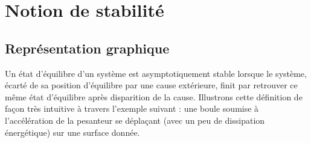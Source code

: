 \def\xxactivite{Cours}
\def\xxauteur{\textsl{Xavier Pessoles}}

\fichefalse
\proftrue
\tdfalse
\courstrue

\def\xxnumchapitre{Chapitre 3 \vspace{.2cm}}
\def\xxchapitre{\hspace{.12cm} Stabilité des systèmes}

\def\xxcompetences{%
\textsl{%
\textbf{Savoirs et compétences :}\\
\begin{itemize}[label=\ding{112},font=\color{bleuxp}] 
\item \textit{Mod3.C2 : } pôles dominants et réduction de l’ordre du modèle : principe, justification
\item \textit{Res2.C4 : } stabilité des SLCI : définition entrée bornée -- sortie bornée (EB -- SB)	
\item \textit{Res2.C5 : } stabilité des SLCI : équation caractéristique	
\item \textit{Res2.C6 : } stabilité des SLCI : position des pôles dans le plan complexe
\item \textit{Res2.C7 : } stabilité des SLCI : marges de stabilité (de gain et de phase)
\end{itemize}
}}


\def\xxfigures{
\texttt{[image: SoloWheel\_Orbit]}%
\\
\textit{SoloWheel Orbit.}
}%



%
\setlength{\columnseprule}{.1pt}

\pagestyle{fancy}


\section{Notion de stabilité}
\subsection{Représentation graphique \cite{1}}
Un état d'équilibre d'un système est asymptotiquement stable lorsque le système, écarté de sa position d'équilibre par une
cause extérieure, finit par retrouver ce même état d'équilibre après disparition de la
cause.
Illustrons cette définition de façon très intuitive à travers l'exemple suivant : une boule
soumise à l'accélération de la pesanteur se déplaçant (avec un peu de dissipation
énergétique) sur une surface donnée.

